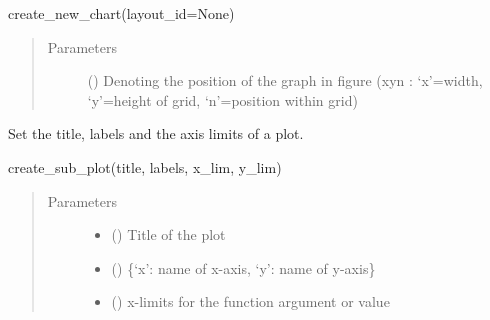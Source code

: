 \documentclass[letterpaper,10pt,english,openany,oneside]{sphinxmanual}
\begin{document}
\begin{fulllineitems}
\begin{fulllineitems}
create\_new\_chart(layout\_id=None)
\begin{quote}\begin{description}
\item[{Parameters}] \leavevmode
{} (\sphinxstyleliteralemphasis{\sphinxupquote{(}}\sphinxstyleliteralemphasis{\sphinxupquote{) }}\sphinxstyleliteralemphasis{\sphinxupquote{, }}\sphinxstyleliteralemphasis{\sphinxupquote{, }}) \textendash{} Denoting the position of the graph in figure (xyn : ‘x’=width, ‘y’=height of grid, ‘n’=position within grid)

\end{description}\end{quote}

\end{fulllineitems}


\begin{fulllineitems}
\label{\detokenize{pygpc:pygpc.Visualization.Visualization.create_sub_plot}}
Set the title, labels and the axis limits of a plot.

create\_sub\_plot(title, labels, x\_lim, y\_lim)
\begin{quote}\begin{description}
\item[{Parameters}] \leavevmode\begin{itemize}
\item {} 
 () \textendash{} Title of the plot

\item {} 
 () \textendash{} \{‘x’: name of x-axis, ‘y’: name of y-axis\}

\item {} 
 (\sphinxstyleliteralemphasis{\sphinxupquote{ {[}}}\sphinxstyleliteralemphasis{\sphinxupquote{{]}}}) \textendash{} x-limits for the function argument or value


\end{itemize}
\end{description}
\end{quote}
\end{fulllineitems}
\end{fulllineitems}
\end{document}

